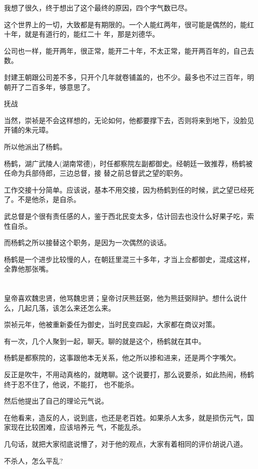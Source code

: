 \documentclass[11pt,a4paper,onecolumn]{article}
\begin{document}
我想了很久，终于想出了这个最终的原因，四个字\myrule 气数已尽。

这个世界上的一切，大致都是有期限的。一个人能红两年，很可能是偶然的，能红十年，就是有道行的，能红二十
年，那是刘德华。

公司也一样，能开两年，很正常，能开二十年，不太正常，能开两百年的，自己去数。

封建王朝跟公司差不多，只开个几年就卷铺盖的，也不少。最多也不过三百年，明朝开了二百多年，够意思了。

抚战

当然，崇祯是不会这样想的，无论如何，他都要撑下去，否则将来到地下，没脸见开铺的朱元璋。

所以他派出了杨鹤。

杨鹤，湖广武陵人(湖南常德)，时任都察院左副都御史。经朝廷一致推荐，杨鹤被任命为兵部侍郎，三边总督，接
替之前总督武之望的职务。

工作交接十分简单。应该说，基本不用交接，因为杨鹤到任的时候，武之望已经死了。不是他杀，是自杀。

武总督是个很有责任感的人，鉴于西北民变太多，估计回去也没什么好果子吃，索性自杀。

而杨鹤之所以接替这个职务，是因为一次偶然的谈话。

杨鹤是一个进步比较慢的人，在朝廷里混三十多年，才当上佥都御史，混成这样，全靠他那张嘴。

\section[\thesection]{}

皇帝喜欢魏忠贤，他骂魏忠贤；皇帝讨厌熊廷弼，他为熊廷弼辩护。想什么说什么，几起几落，该怎么来还怎么来。

崇祯元年，他被重新委任为御史，当时民变四起，大家都在商议对策。

有一次，几个人聚到一起，聊天。聊的就是这个，杨鹤就在其中。

杨鹤是都察院的，这事跟他本无关系，他之所以掺和进来，还是两个字\myrule 嘴欠。

反正是吹牛，不用动真格的，就瞎聊。这个说要打，那么说要杀，如此热闹，杨鹤终于忍不住了，他说，不能打，
也不能杀。

然后他提出了自己的理论\myrule 元气说。

在他看来，造反的人，说到底，也还是老百姓。如果杀人太多，就是损伤元气，国家现在比较困难，应该培养元
气，不能乱杀。

几句话，就把大家彻底说懵了，对于他的观点，大家有着相同的评价\myrule 胡说八道。

不杀人，怎么平乱?
\end{document}
